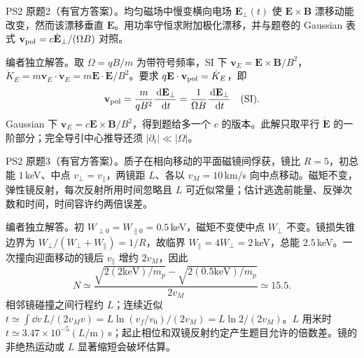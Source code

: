 \begin{exercise}\label{ex:hist02-2-2}
PS2 原题2（有官方答案）。均匀磁场中慢变横向电场 $\mathbf E_\perp(t)$ 使 $\mathbf E\times\mathbf B$ 漂移动能改变，然而该漂移垂直 $\mathbf E$。用功率守恒求附加极化漂移，并与题卷的 Gaussian 表式 $\mathbf v_{\rm pol}=c\dot{\mathbf E}_\perp/(\Omega B)$ 对照。
\end{exercise}
\begin{solution}
编者独立解答。取 $\Omega=qB/m$ 为带符号频率，SI 下 $\mathbf v_E=\mathbf E\times\mathbf B/B^2$，$\dot K_E=m\mathbf v_E\cdot\dot{\mathbf v}_E=m\mathbf E\cdot\dot{\mathbf E}/B^2$。要求 $q\mathbf E\cdot\mathbf v_{\rm pol}=\dot K_E$，即
\begin{equation}\mathbf v_{\rm pol}=\frac{m}{qB^2}\frac{\,\mathrm d\mathbf E_\perp}{\,\mathrm d t}=\frac1{\Omega B}\frac{\,\mathrm d\mathbf E_\perp}{\,\mathrm d t}\quad\text{(SI)}.
\end{equation}
Gaussian 下 $\mathbf v_E=c\mathbf E\times\mathbf B/B^2$，得到题给多一个 $c$ 的版本。此解只取平行 $\dot{\mathbf E}$ 的一阶部分；完全导引中心推导还须 $|\partial_t|\ll|\Omega|$。
\end{solution}

\begin{exercise}\label{ex:hist02-2-3}
PS2 原题3（有官方答案）。质子在相向移动的平面磁镜间俘获，镜比 $R=5$，初总能 $1\,$keV、中点 $v_\perp=v_\parallel$，两镜距 $L$、各以 $v_M=10\,$km/s 向中点移动。磁矩不变，弹性镜反射，每次反射所用时间忽略且 $L$ 可近似常量；估计逃逸前能量、反弹次数和时间，时间容许约两倍误差。
\end{exercise}
\begin{solution}
编者独立解答。初 $W_{\perp0}=W_{\parallel0}=0.5\,$keV，磁矩不变使中点 $W_\perp$ 不变。镜损失锥边界为 $W_\perp/(W_\perp+W_\parallel)=1/R$，故临界 $W_\parallel=4W_\perp=2\,$keV，总能 $2.5\,$keV。一次撞向迎面移动的镜后 $v_\parallel$ 增约 $2v_M$，因此
\begin{equation}N\simeq\frac{\sqrt{2(2\mathrm{keV})/m_p}-\sqrt{2(0.5\mathrm{keV})/m_p}}{2v_M}\simeq15.5.
\end{equation}
相邻镜碰撞之间行程约 $L$；连续近似 $t\simeq\int\dd v\,L/(2v_Mv)=L\ln(v_f/v_0)/(2v_M)=L\ln2/(2v_M)$。$L$ 用米时 $t\simeq3.47\times10^{-5}(L/\mathrm m)\,$s；起止相位和双镜反射约定产生题目允许的倍数差。镜的非绝热运动或 $L$ 显著缩短会破坏估算。
\end{solution}

